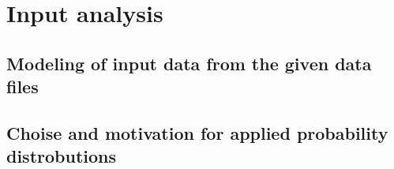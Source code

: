 \section{Input analysis}

\subsection{Modeling of input data from the given data files}

\subsection{Choise and motivation for applied probability distrobutions}
